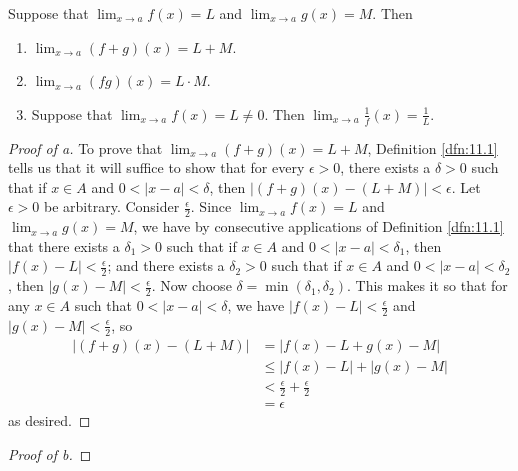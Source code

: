 \documentclass[../main.tex]{subfiles}
\begin{document}
\begin{theorem}\label{trm:11.9}
    Suppose that $\lim_{x\to a}f(x)=L$ and $\lim_{x\to a}g(x)=M$. Then
    \begin{enumerate}[label={\textup{(}\alph*\textup{)}}]
        \item $\lim_{x\to a}(f+g)(x)=L+M$.
        \item $\lim_{x\to a}(fg)(x)=L\cdot M$.
        \item Suppose that $\lim_{x\to a}f(x)=L\neq 0$. Then $\lim_{x\to a}\frac{1}{f}(x)=\frac{1}{L}$.
    \end{enumerate}
    \begin{proof}[Proof of a]To prove that $\lim_{x\to a}(f+g)(x)=L+M$, Definition \ref{dfn:11.1} tells us that it will suffice to show that for every $\epsilon>0$, there exists a $\delta>0$ such that if $x\in A$ and $0<|x-a|<\delta$, then $|(f+g)(x)-(L+M)|<\epsilon$. Let $\epsilon>0$ be arbitrary. Consider $\frac{\epsilon}{2}$. Since $\lim_{x\to a}f(x)=L$ and $\lim_{x\to a}g(x)=M$, we have by consecutive applications of Definition \ref{dfn:11.1} that there exists a $\delta_1>0$ such that if $x\in A$ and $0<|x-a|<\delta_1$, then $|f(x)-L|<\frac{\epsilon}{2}$; and there exists a $\delta_2>0$ such that if $x\in A$ and $0<|x-a|<\delta_2$, then $|g(x)-M|<\frac{\epsilon}{2}$. Now choose $\delta=\min(\delta_1,\delta_2)$. This makes it so that for any $x\in A$ such that $0<|x-a|<\delta$, we have $|f(x)-L|<\frac{\epsilon}{2}$ and $|g(x)-M|<\frac{\epsilon}{2}$, so
        \begin{align*}
            |(f+g)(x)-(L+M)| &= |f(x)-L+g(x)-M|\\
            &\leq |f(x)-L|+|g(x)-M|\\
            &< \frac{\epsilon}{2}+\frac{\epsilon}{2}\\
            &= \epsilon
        \end{align*}
        as desired.
    \end{proof}
    \begin{proof}[Proof of b]

\end{proof}
\end{theorem}
\end{document}

